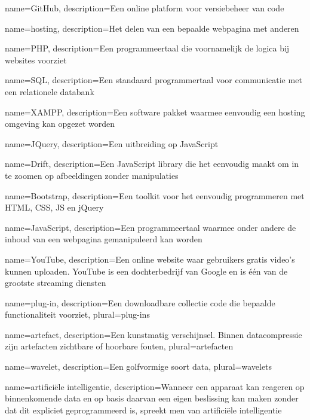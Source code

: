 {
	name={GitHub},
	description={Een online platform voor versiebeheer van code}
}

{
	name={hosting},
	description={Het delen van een bepaalde webpagina met anderen}
}

{
	name={PHP},
	description={Een programmeertaal die voornamelijk de logica bij websites voorziet}
}

{
	name={SQL},
	description={Een standaard programmertaal voor communicatie met een relationele databank}
}

{
	name={XAMPP},
	description={Een software pakket waarmee eenvoudig een hosting omgeving kan opgezet worden}
}

{
	name={JQuery},
	description={Een uitbreiding op JavaScript}
}

{
	name={Drift},
	description={Een JavaScript library die het eenvoudig maakt om in te zoomen op afbeeldingen zonder manipulaties}
}

{
	name={Bootstrap},
	description={Een toolkit voor het eenvoudig programmeren met HTML, CSS, JS en jQuery}
}

{
	name={JavaScript},
	description={Een programmeertaal waarmee onder andere de inhoud van een webpagina gemanipuleerd kan worden}
}

{
	name={YouTube},
	description={Een online website waar gebruikers gratis video's kunnen uploaden. YouTube is een dochterbedrijf van Google en is één van de grootste streaming diensten}
}

{
	name={plug-in},
	description={Een downloadbare collectie code die bepaalde functionaliteit voorziet},
	plural={plug-ins}
}

{
	name={artefact},
	description={Een kunstmatig verschijnsel. Binnen datacompressie zijn artefacten zichtbare of hoorbare fouten},
	plural={artefacten}
}

{
	name={wavelet},
	description={Een golfvormige soort data},
	plural={wavelets}
}

{
	name={artificiële intelligentie},
	description={Wanneer een apparaat kan reageren op binnenkomende data en op basis daarvan een eigen beslissing kan maken zonder dat dit expliciet geprogrammeerd is, spreekt men van artificiële intelligentie}
}

